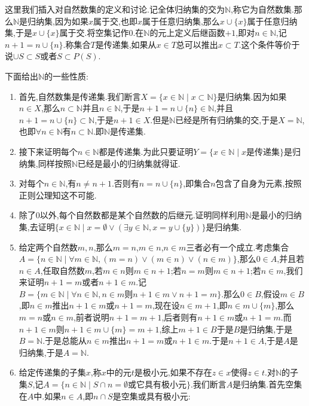 这里我们插入对自然数集的定义和讨论.记全体归纳集的交为$\mathbb{N}$,称它为自然数集.那么$\mathbb{N}$是归纳集,因为如果$x$属于交,也即$x$属于任意归纳集,那么$x\cup\{x\}$属于任意归纳集,于是$x\cup\{x\}$属于交.将空集记作0.在$\mathbb{N}$的元上定义后继函数$+1$,即对$n\in\mathbb{N}$,记$n+1=n\cup\{n\}$.称集合$T$是传递集,如果从$x\in T$总可以推出$x\subset T$.这个条件等价于说$\cup S\subset S$或者$S\subset P(S)$.

下面给出$\mathbb{N}$的一些性质:
\begin{enumerate}
	\item 首先,自然数集是传递集.我们断言$X=\{x\in\mathbb{N}\mid x\subset\mathbb{N}\}$是归纳集.因为如果$n\in X$,那么$n\subset\mathbb{N}$并且$n\in\mathbb{N}$,于是$n+1=n\cup\{n\}\in\mathbb{N}$,并且$n+1=n\cup\{n\}\subset\mathbb{N}$,于是$n+1\in X$.但是$\mathbb{N}$已经是所有归纳集的交,于是$X=\mathbb{N}$,也即$\forall n\in\mathbb{N}$有$n\subset\mathbb{N}$.即$\mathbb{N}$是传递集.
	\item 接下来证明每个$n\in\mathbb{N}$都是传递集.为此只要证明$Y=\{x\in\mathbb{N}\mid x\text{是传递集}\}$是归纳集,同样按照$\mathbb{N}$已经是最小的归纳集就得证.
	\item 对每个$n\in\mathbb{N}$,有$n\not=n+1$.否则有$n=n\cup\{n\}$,即集合$n$包含了自身为元素,按照正则公理知这不可能.
	\item 除了0以外,每个自然数都是某个自然数的后继元.证明同样利用$\mathbb{N}$是最小的归纳集,去证明$\{x\in\mathbb{N}\mid x=\emptyset\vee (\exists y\in\mathbb{N},x=y\cup\{y\})\}$是归纳集.
	\item 给定两个自然数$m,n$,那么$m=n$,$m\in n$,$n\in m$三者必有一个成立.考虑集合$A=\{n\in\mathbb{N}\mid\forall m\in\mathbb{N},(m=n)\vee(m\in n)\vee(n\in m)\}$,那么$0\in A$,并且若$n\in A$,任取自然数$m$,若$m\in n$则$m\in n+1$;若$n=m$则$m\in n+1$;若$n\in m$,我们来证明$n+1=m$或者$n+1\in m$.记$B=\{m\in\mathbb{N}\mid\forall n\in\mathbb{N},n\in m\text{则} n+1\in m\vee n+1=m\}$.那么$0\in B$,假设$m\in B$,即$n\in m$推出$n+1\in m$或$n+1=m$,现在设$n\in m+1$,即$n\in m\cup\{m\}$,那么$m=n$或$n\in m$,前者说明$n+1=m+1$,后者则有$n+1\in m$或$n+1=m$.而$n+1\in m$则$n+1\in m\cup\{m\}=m+1$,综上$m+1\in B$于是$B$是归纳集,于是$B=\mathbb{N}$.于是总能从$n\in m$推出$n+1=m$或$n+1\in m$.于是$n+1\in A$,于是$A$是归纳集,于是$A=\mathbb{N}$.
	\item 给定传递集的子集$x$,称$x$中的元$t$是极小元,如果不存在$z\in x$使得$z\in t$.对$\mathbb{N}$的子集$S$,记$A=\{n\in\mathbb{N}\mid S\cap n=\emptyset\text{或它具有极小元}\}$.我们断言$A$是归纳集.首先空集在$A$中.如果$n\in A$,即$n\cap S$是空集或具有极小元:
	\begin{enumerate}

\end{enumerate}
\end{enumerate}
